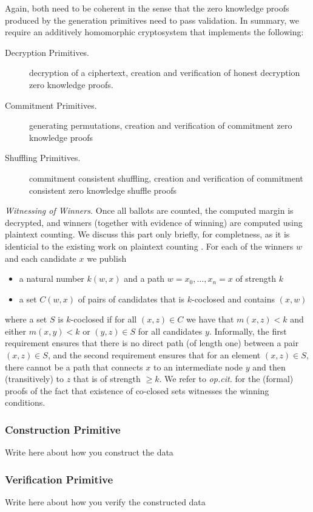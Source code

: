 \noindent
Again, both need to be coherent in the sense that the zero knowledge
proofs produced by the generation primitives need to pass
validation. In summary, we require an additively homomorphic
cryptosystem that implements the following:

\begin{description}
\item[Decryption Primitives.]
  decryption of a ciphertext, creation and verification of
  honest decryption zero knowledge proofs.
\item[Commitment Primitives.]
  generating permutations, creation and verification of commitment
  zero knowledge proofs
\item[Shuffling Primitives.]
  commitment consistent shuffling, creation and verification of
  commitment consistent zero knowledge shuffle proofs 
\end{description}

\smallskip\noindent\emph{Witnessing of Winners.}
Once all ballots are counted, the computed margin is decrypted, and
winners (together with evidence of winning) are computed using 
plaintext counting. We discuss this part only briefly, for completness,
 as it is identicial to the existing work on plaintext counting
\cite{Pattinson:2017:SVE}. For each of the winners $w$ and each
candidate $x$ we publish
\begin{itemize}
\item a natural number $k(w, x)$ and a path $w = x_0, \dots, x_n = x$ of strength $k$
\item a set $C(w, x)$ of pairs of candidates that is $k$-coclosed
and contains $(x, w)$
\end{itemize}
where a set $S$ is  $k$-coclosed if for all $(x,z) \in C$ we have
that $m(x, z) < k$ and either $m(x, y) < k$ or $(y,z) \in S$ for
all candidates $y$.  Informally, the first requirement ensures that
there is no direct path (of length one) between a pair $(x, z) \in
S$, and the second requirement ensures that for an element $(x, z)
\in S$, there cannot be a path that connects $x$ to an intermediate
node $y$ and then (transitively) to $z$ that is of strength $\geq
k$. 
We refer to \emph{op.cit.} for the (formal)
proofs of the fact that existence of co-closed sets witnesses the
winning conditions. 
  	\subsubsection{Construction Primitive}
  	  Write here about how you construct the data
  	\subsubsection{Verification Primitive}
  	  Write here about how you verify the constructed 
  	  data

